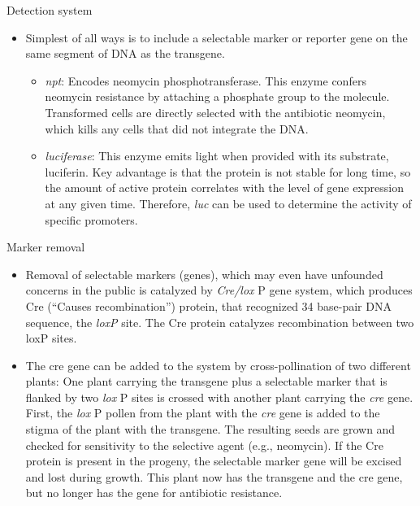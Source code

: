 \documentclass[
  ignorenonframetext,
  aspectratio=169]{beamer}
\providecommand{\tightlist}{%
  \setlength{\itemsep}{0pt}\setlength{\parskip}{0pt}}
\begin{document}
\begin{frame}{Detection system}
\protect\hypertarget{detection-system}{}
\begin{itemize}
\tightlist
\item
  Simplest of all ways is to include a selectable marker or reporter
  gene on the same segment of DNA as the transgene.

  \begin{itemize}
  \tightlist
  \item
    \emph{npt}: Encodes neomycin phosphotransferase. This enzyme confers
    neomycin resistance by attaching a phosphate group to the molecule.
    Transformed cells are directly selected with the antibiotic
    neomycin, which kills any cells that did not integrate the DNA.
  \item
    \emph{luciferase}: This enzyme emits light when provided with its
    substrate, luciferin. Key advantage is that the protein is not
    stable for long time, so the amount of active protein correlates
    with the level of gene expression at any given time. Therefore,
    \emph{luc} can be used to determine the activity of specific
    promoters.
  \end{itemize}
\end{itemize}
\end{frame}

\begin{frame}{Marker removal}
\protect\hypertarget{marker-removal}{}
\begin{itemize}
\tightlist
\item
  Removal of selectable markers (genes), which may even have unfounded
  concerns in the public is catalyzed by \emph{Cre/lox} P gene system,
  which produces Cre (``Causes recombination'') protein, that recognized
  34 base-pair DNA sequence, the \emph{\emph{loxP}} site. The Cre
  protein catalyzes recombination between two loxP sites.
\item
  The cre gene can be added to the system by cross-pollination of two
  different plants: One plant carrying the transgene plus a selectable
  marker that is flanked by two \emph{lox} P sites is crossed with
  another plant carrying the \emph{cre} gene. First, the \emph{lox} P
  pollen from the plant with the \emph{cre} gene is added to the stigma
  of the plant with the transgene. The resulting seeds are grown and
  checked for sensitivity to the selective agent (e.g., neomycin). If
  the Cre protein is present in the progeny, the selectable marker gene
  will be excised and lost during growth. This plant now has the
  transgene and the cre gene, but no longer has the gene for antibiotic
  resistance.
\end{itemize}
\end{frame}
\end{document}
